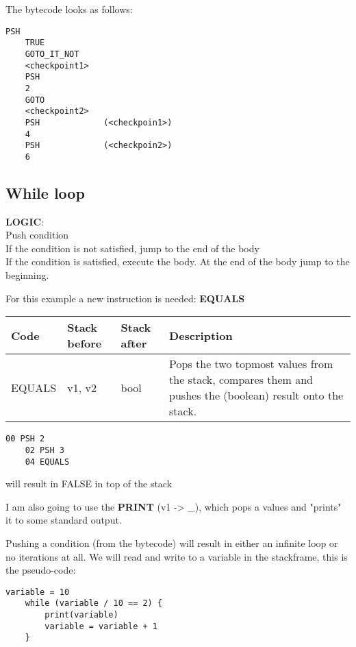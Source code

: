 \documentclass[../documentation.tex]{subfiles}
\begin{document}
\pagebreak

The bytecode looks as follows:

\begin{lstlisting}[style=generic]
    PSH
    TRUE
    GOTO_IT_NOT
    <checkpoint1>
    PSH
    2
    GOTO
    <checkpoint2>
    PSH             (<checkpoin1>)
    4
    PSH             (<checkpoin2>)
    6
\end{lstlisting}

\subsection{While loop}

\textbf{LOGIC}:
\\
Push condition
\\
If the condition is not satisfied, jump to the end of the body
\\
If the condition is satisfied, execute the body. At the end of the body jump to the beginning.

For this example a new instruction is needed: \textbf{EQUALS}

\bgroup{}
\def\arraystretch{1.25}
\begin{center}
    \begin{tabular}{ |l|l|l|p{7cm}| }
        \hline
        \textbf{Code} & \textbf{Stack before} & \textbf{Stack after} & \textbf{Description} \\
        \hline
        EQUALS & v1, v2 & bool & Pops the two topmost values from the stack, compares them and pushes the (boolean) result onto the stack.        \\
        \hline
    \end{tabular}
\end{center}
\egroup{}

\begin{lstlisting}[style=generic]
    00 PSH 2
    02 PSH 3
    04 EQUALS
\end{lstlisting}

will result in FALSE in top of the stack

I am also going to use the \textbf{PRINT} (v1 -> \_), which pops a values and "prints" it to some standard output.

Pushing a condition (from the bytecode) will result in either an infinite loop or no iterations at all.
We will read and write to a variable in the stackframe, this is the pseudo-code:

\begin{lstlisting}[style=generic]
    variable = 10
    while (variable / 10 == 2) {
        print(variable)
        variable = variable + 1
    }
\end{lstlisting}
\end{document}
